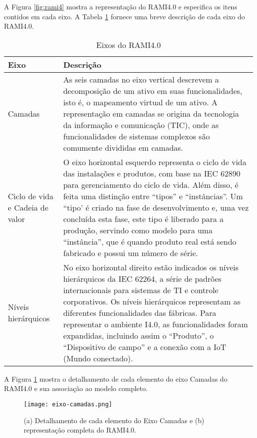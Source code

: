 	A Figura \ref{fig:rami4} mostra a representação do RAMI4.0 e especifica os itens contidos em cada eixo. A Tabela \ref{tab:rami-eixos} fornece uma breve descrição de cada eixo do RAMI4.0.
	
	\begin{table}[H]
		\centering
		\caption{Eixos do RAMI4.0}
		\begin{tabular}{|p{1.3in}|p{4in}|}
			
			\hline
			\textbf{Eixo}
			&\textbf{Descrição} \\
			
			\hline
			Camadas
			& As seis camadas no eixo vertical descrevem a decomposição de um ativo em suas funcionalidades, isto é, o mapeamento virtual de um ativo. A representação em camadas se origina da tecnologia da informação e comunicação (TIC), onde as funcionalidades de sistemas complexos são comumente divididas em camadas. \\
			
			
			\hline
			Ciclo de vida e  Cadeia de valor
			& O eixo horizontal esquerdo representa o ciclo de vida das instalações e produtos, com base na IEC 62890 para gerenciamento do ciclo de vida. Além disso, é feita uma distinção entre ``tipos'' e ``instâncias''. Um ``tipo' é criado na fase de desenvolvimento e, uma vez concluída esta fase, este tipo é liberado para a produção, servindo como modelo para uma ``instância'', que é quando produto real está sendo fabricado e possui um número de série. \\
			
			\hline
			Níveis hierárquicos
			& No eixo horizontal direito estão indicados os níveis hierárquicos da IEC 62264, a série de padrões internacionais para sistemas de TI e controle corporativos. Os níveis hierárquicos representam as diferentes funcionalidades das fábricas. Para representar o ambiente I4.0, as funcionalidades foram expandidas, incluindo assim o ``Produto'', o ``Dispositivo de campo'' e a conexão com a IoT (Mundo conectado). \\
			\hline
			
		\end{tabular}
		\label{tab:rami-eixos}
	\end{table}

	A Figura \ref{fig:eixo-camadas} mostra o detalhamento de cada elemento do eixo Camadas do RAMI4.0 e sua associação ao modelo completo.
	
	\begin{figure}[H]
		\centering
		\caption{(a) Detalhamento de cada elemento do Eixo Camadas e (b) representação completa do RAMI4.0.}
		\texttt{[image: eixo-camadas.png]}
		\label{fig:eixo-camadas}
	\end{figure}


